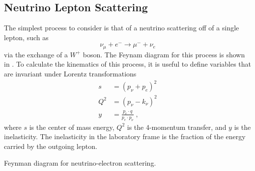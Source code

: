 \subsection{Neutrino Lepton Scattering}
The simplest process to consider is that of a neutrino scattering off of a single lepton, such as
\begin{equation}
    \nu_\mu + e^- \rightarrow \mu^- + \nu_e
\end{equation}
via the exchange of a $W^+$ boson. The Feynam diagram for this process is shown in .
To calculate the kinematics of this process, it is useful to define variables that are invariant under Lorentz transformations
\begin{equation}
\begin{aligned}
    s &= (p_\nu + p_e)^2 \\
    Q^2 &= (p_\nu - k_\nu)^2 \\
    y &= \frac{p_e \cdot q}{p_e \cdot p_\nu}\;,
\end{aligned}\label{eq:kinematic-quantities}
\end{equation}
where $s$ is the center of mass energy, $Q^2$ is the 4-momentum transfer, and $y$ is the inelasticity. The inelasticity in the laboratory frame is the fraction of the energy carried by the outgoing lepton.
\begin{marginfigure}
\caption{Feynman diagram for neutrino-electron scattering.\label{fig:feynman-nue-scatter}}
\end{marginfigure}
